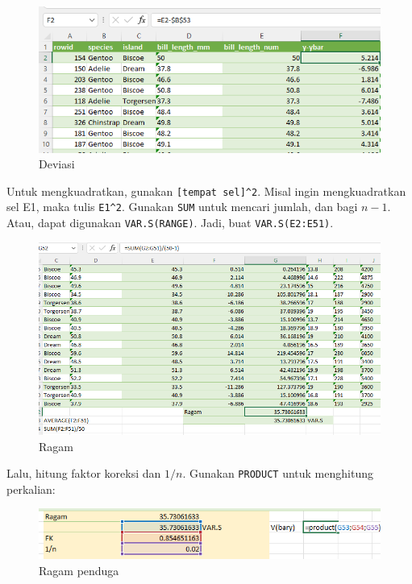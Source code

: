 \documentclass[
  letterpaper,
  DIV=11,
  numbers=noendperiod]{scrreprt}
\begin{document}
\begin{figure}

{\centering \includegraphics{./count-4.png}

}

\caption{Deviasi}

\end{figure}

Untuk mengkuadratkan, gunakan \texttt{{[}tempat\ sel{]}\^{}2}. Misal
ingin mengkuadratkan sel E1, maka tulis \texttt{E1\^{}2}. Gunakan
\texttt{SUM} untuk mencari jumlah, dan bagi \(n-1\). Atau, dapat
digunakan \texttt{VAR.S(RANGE)}. Jadi, buat \texttt{VAR.S(E2:E51)}.

\begin{figure}

{\centering \includegraphics{./count-6.png}

}

\caption{Ragam}

\end{figure}

Lalu, hitung faktor koreksi dan \(1/n\). Gunakan \texttt{PRODUCT} untuk
menghitung perkalian:

\begin{figure}

{\centering \includegraphics{./count-7.png}

}

\caption{Ragam penduga}

\end{figure}
\end{document}
